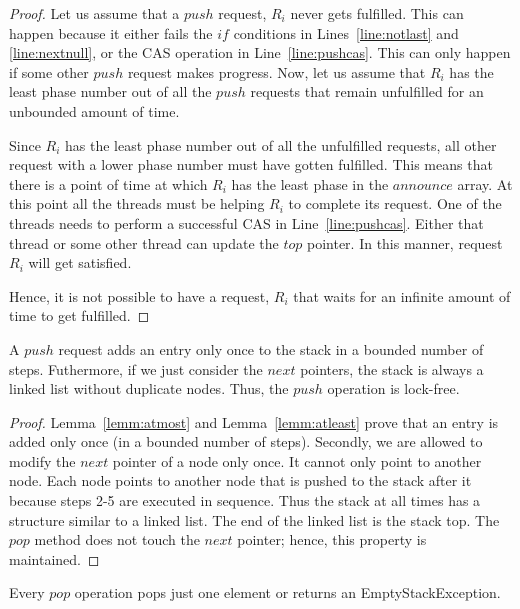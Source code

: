 \documentclass{llncs}
\begin{document}
\begin{appendix}
\begin{proof}
Let us assume that a $push$ request, $R_i$ never gets fulfilled. This can
happen because it either fails the $if$ conditions in Lines~\ref{line:notlast} and \ref{line:nextnull}, 
or the CAS operation in Line~\ref{line:pushcas}. This can only happen if some other $push$
request makes progress. Now, let us assume that $R_i$ has the least phase
number out of all the $push$ requests that remain unfulfilled for an unbounded
amount of time. 

Since $R_i$ has the least phase number out of all the unfulfilled requests, all
other request with a lower phase number must have gotten fulfilled. This means
that there is a point of time at which $R_i$ has the least phase in the $announce$
array. At this point all the threads must be helping $R_i$ to complete its request.
One of the threads needs to perform a successful CAS in Line~\ref{line:pushcas}. Either that thread
or some other thread can update the $top$ pointer. In this manner, request $R_i$ will
get satisfied. 

Hence, it is not possible to have a request, $R_i$ that waits for an infinite amount
of time to get fulfilled. 
\end{proof}

\begin{theorem}
A $push$ request adds an entry only once to the stack in a bounded
number of steps. Futhermore, if we
just consider the $next$ pointers,  the stack 
is always a linked list without duplicate nodes. 
Thus, the $push$ operation is lock-free.
\end{theorem}

\begin{proof}
Lemma~\ref{lemm:atmost} and Lemma~\ref{lemm:atleast} prove that an entry is added
only once (in a bounded number of steps).
Secondly, we are allowed to modify the $next$ pointer of a node only once.
It cannot only point to another node. Each node points to another node that is pushed
to the stack after it because steps 2-5 are executed in sequence. Thus the stack
at all times has a structure similar to a linked list. The end of the linked list
is the stack top. The $pop$ method does not touch the $next$ pointer; hence, this
property is maintained.
\end{proof}



\begin{lemma}
Every $pop$ operation pops just one element or returns an EmptyStackException.
\label{lemm:poponce}
\end{lemma}


\end{appendix}
\end{document}
